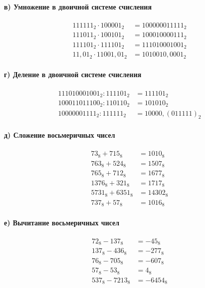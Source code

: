 \documentclass[a4paper,12pt]{article}
\begin{document}
\paragraph{в) Умножение в двоичной системе счисления}

$$
\begin{aligned}
111111_2 \cdot 100001_2 &= 100000011111_2 \\
111011_2 \cdot 100101_2 &= 100010000111_2 \\
111101_2 \cdot 111101_2 &= 111010001001_2 \\
11{,}01_2 \cdot 11001{,}01_2 &= 1010010{,}0001_2
\end{aligned}
$$

\paragraph{г) Деление в двоичной системе счисления}

$$
\begin{aligned}
111010001001_2 : 111101_2 &= 111101_2 \\
100011011100_2 : 110110_2 &= 101010_2 \\
10000001111_2 : 111111_2 &= 10000{,}(011111)_2
\end{aligned}
$$

\paragraph{д) Сложение восьмеричных чисел}

$$
\begin{aligned}
73_8 + 715_8 &= 1010_8 \\
763_8 + 524_8 &= 1507_8 \\
765_8 + 712_8 &= 1677_8 \\
1376_8 + 321_8 &= 1717_8 \\
5731_8 + 6351_8 &= 14302_8 \\
737_8 + 57_8 &= 1016_8
\end{aligned}
$$

\paragraph{е) Вычитание восьмеричных чисел}

$$
\begin{aligned}
72_8 - 137_8 &= -45_8 \\
137_8 - 436_8 &= -277_8 \\
76_8 - 705_8 &= -607_8 \\
57_8 - 53_8 &= 4_8 \\
537_8 - 7213_8 &= -6454_8
\end{aligned}
$$
\end{document}
